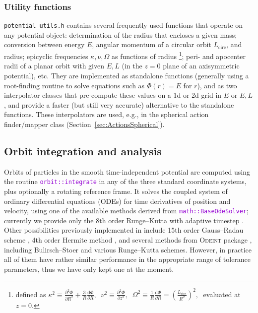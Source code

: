 \documentclass[12pt]{article}
\newcommand{\ttt}[1]{\textcolor{darkviolet}{\texttt{#1}}}
\renewcommand{\d}{\mathrm{d}}
\newcommand{\D}{\partial}
\begin{document}
\subsubsection{Utility functions}  \label{sec:PotentialUtility}

\texttt{potential_utils.h} contains several frequently used functions that operate on any potential object: determination of the radius that encloses a given mass; conversion between energy $E$, angular momentum of a circular orbit $L_\mathrm{circ}$, and radius; epicyclic frequencies $\kappa,\nu,\Omega$ as functions of radius%
\footnote{defined as $\displaystyle \kappa^2\equiv \frac{\D ^2\Phi}{\D R^2} + \frac 3 R \frac{\d\Phi}{\D R},\;\; \nu^2\equiv \frac{\D ^2\Phi}{\D z^2},\;\; \Omega^2\equiv \frac 1 R \frac{\d\Phi}{\D R} = \left(\frac{L_\mathrm{circ}}{R^2}\right)^2,\;$ evaluated at $z=0$.};
peri- and apocenter radii of a planar orbit with given $E,L$ (in the $z=0$ plane of an axisymmetric potential), etc. They are implemented as standalone functions (generally using a root-finding routine to solve equations such as $\Phi(r)=E$ for $r$), and as two interpolator classes that pre-compute these values on a 1d or 2d grid in $E$ or $E,L$, and provide a faster (but still very accurate) alternative to the standalone functions. These interpolators are used, e.g., in the spherical action finder/mapper class (Section~\ref{sec:ActionsSpherical}).


\subsection{Orbit integration and analysis}  \label{sec:Orbits}

Orbits of particles in the smooth time-independent potential are computed using the routine \ttt{orbit::integrate} in any of the three standard coordinate systems, plus optionally a rotating reference frame. It solves the coupled system of ordinary differential equations (ODEs) for time derivatives of position and velocity, using one of the available methods derived from \ttt{math::BaseOdeSolver}; currently we provide only the 8th order Runge--Kutta with adaptive timestep \cite{DOP853}. Other possibilities previously implemented in \cite{Vasiliev2013} include 15th order Gauss--Radau scheme \cite{IAS15}, 4th order Hermite method \cite{Hermite}, and several methods from \textsc{Odeint} package \cite{odeint}, including Bulirsch--Stoer and various Runge--Kutta schemes. However, in practice all of them have rather similar performance in the appropriate range of tolerance parameters, thus we have only kept one at the moment.
\end{document}
